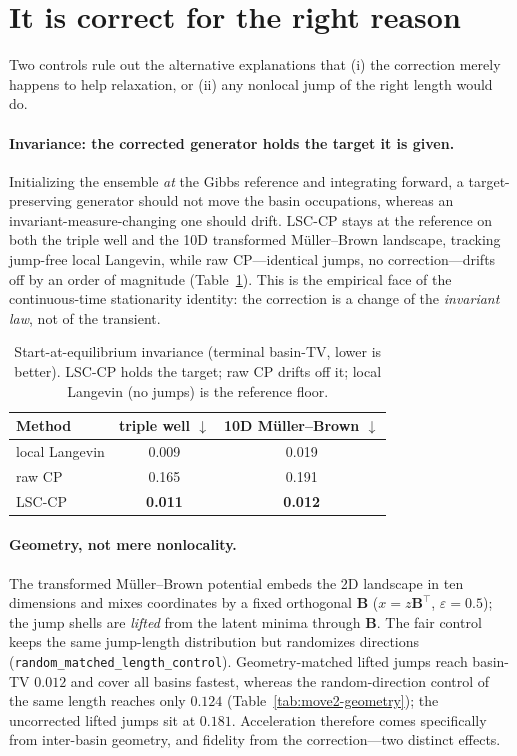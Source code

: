 \section{It is correct for the right reason}
\label{sec:move2}

Two controls rule out the alternative explanations that (i) the correction merely happens to help
relaxation, or (ii) any nonlocal jump of the right length would do.

\paragraph{Invariance: the corrected generator holds the target it is given.} Initializing the
ensemble \emph{at} the Gibbs reference and integrating forward, a target-preserving generator should
not move the basin occupations, whereas an invariant-measure-changing one should drift. LSC-CP stays
at the reference on both the triple well and the 10D transformed M\"uller--Brown landscape, tracking
jump-free local Langevin, while raw CP---identical jumps, no correction---drifts off by an order of
magnitude (Table~\ref{tab:move2-invariance}). This is the empirical face of the continuous-time
stationarity identity: the correction is a change of the \emph{invariant law}, not of the transient.

\begin{table}[t]
\centering\small
\caption{Start-at-equilibrium invariance (terminal basin-TV, lower is better). LSC-CP holds the
target; raw CP drifts off it; local Langevin (no jumps) is the reference floor.}
\label{tab:move2-invariance}
\begin{tabular}{lcc}
\toprule
Method & triple well $\downarrow$ & 10D M\"uller--Brown $\downarrow$ \\
\midrule
local Langevin & 0.009 & 0.019 \\
raw CP         & 0.165 & 0.191 \\
LSC-CP         & \textbf{0.011} & \textbf{0.012} \\
\bottomrule
\end{tabular}
\end{table}

\paragraph{Geometry, not mere nonlocality.} The transformed M\"uller--Brown potential embeds the 2D
landscape in ten dimensions and mixes coordinates by a fixed orthogonal $\bm B$ ($x=z\bm B^{\!\top}$,
$\varepsilon=0.5$); the jump shells are \emph{lifted} from the latent minima through $\bm B$. The
fair control keeps the same jump-length distribution but randomizes directions
(\texttt{random\_matched\_length\_control}). Geometry-matched lifted jumps reach basin-TV $0.012$
and cover all basins fastest, whereas the random-direction control of the same length reaches only
$0.124$ (Table~\ref{tab:move2-geometry}); the uncorrected lifted jumps sit at $0.181$. Acceleration
therefore comes specifically from inter-basin geometry, and fidelity from the correction---two
distinct effects.


